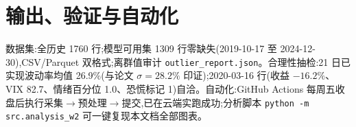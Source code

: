 \documentclass[11pt]{ctexart}
\begin{document}
\section{输出、验证与自动化}
数据集:全历史 1760 行;模型可用集 1309 行零缺失(2019-10-17 至 2024-12-30),CSV/Parquet 双格式;离群值审计 \texttt{outlier\_report.json}。合理性抽检:21 日已实现波动率均值 26.9\%(与论文 $\sigma=28.2\%$ 印证);2020-03-16 行(收益 $-16.2\%$、VIX 82.7、情绪百分位 1.0、恐慌标记 1)自洽。自动化:GitHub Actions 每周五收盘后执行采集$\to$预处理$\to$提交,已在云端实跑成功;分析脚本 \texttt{python -m src.analysis\_w2} 可一键复现本文档全部图表。
\end{document}
